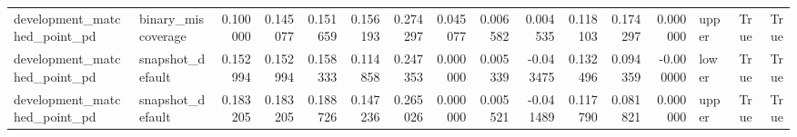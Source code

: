 \begin{tabular}{llrrrrrrrrrrrlrr}
development\_matched\_point\_pd & binary\_miscoverage & 0.100000 & 0.145077 & 0.151659 & 0.156193 & 0.274297 & 0.045077 & 0.006582 & 0.004535 & 0.118103 & 0.174297 & 0.000000 & upper & True & True \\
development\_matched\_point\_pd & snapshot\_default & 0.152994 & 0.152994 & 0.158333 & 0.114858 & 0.247353 & 0.000000 & 0.005339 & -0.043475 & 0.132496 & 0.094359 & -0.000000 & lower & True & True \\
development\_matched\_point\_pd & snapshot\_default & 0.183205 & 0.183205 & 0.188726 & 0.147236 & 0.265026 & 0.000000 & 0.005521 & -0.041489 & 0.117790 & 0.081821 & 0.000000 & upper & True & True \\
\bottomrule
\end{tabular}
